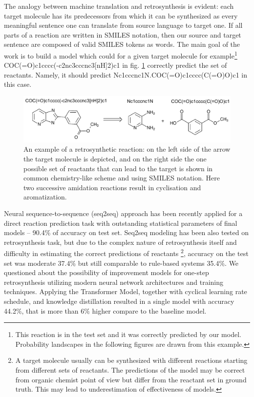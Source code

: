 \documentclass{article}
\begin{document}
The analogy between machine translation and retrosynthesis is evident: each target molecule has 
its predecessors from which it can be synthesized as every meaningful sentence one can translate 
from source language to target one. If all parts of a reaction are written in SMILES notation, 
then our source and target sentence are composed of valid SMILES tokens as words. 
The main goal of the work is to build a model which could for a given target molecule for example\footnote{
This reaction is in the test set and it was correctly predicted  by our model. 
Probability landscapes in the following figures are drawn from this example.} COC(=O)c1cccc(-c2nc3cccnc3[nH]2)c1 in fig. \ref{fig:example}
correctly predict the set of reactants. Namely, it should predict Nc1cccnc1N.COC(=O)c1cccc(C(=O)O)c1 in this case.

\begin{figure}
  \centering
  \includegraphics[scale=0.87]{images/example-reaction.pdf}
  \caption{An example of a retrosynthetic reaction: on the left side of the arrow the target molecule is depicted, and on the right side the one possible set of reactants that can lead to the target is shown in common chemistry-like scheme and using SMILES notation. Here two successive amidation reactions result in cyclisation and aromatization.}
  \label{fig:example}
\end{figure}

Neural sequence-to-sequence (seq2seq) approach has been recently applied for a direct reaction 
prediction task \cite{SchwallerTranslation,SchwallerTransformer} with outstanding statistical 
parameters of final models -- 90.4\% of accuracy on test set. Seq2seq modeling has been also tested on 
retrosynthesis task\cite{Pande}, but due to the complex nature of retrosynthesis itself 
and difficulty in estimating the correct predictions of reactants
\footnote{A target molecule usually can be synthesized with different reactions starting from different sets of reactants. 
The predictions of the model may be correct from organic chemist point of view but differ from 
the reactant set in ground truth. This may lead to underestimation of effectiveness of models.}, 
accuracy on the test set was moderate 37.4\% but still comparable to rule-based systems 35.4\%. 
We questioned about the possibility of improvement models for one-step retrosynthesis utilizing modern neural network architectures 
and training techniques. Applying the Transformer Model\cite{Transformer}, 
together with cyclical learning rate schedule\cite{TransformerTips}, 
and knowledge distillation\cite{Hinton} resulted in a single model with accuracy 44.2\%, 
that is more than 6\% higher compare to the baseline model\cite{Pande}.  
\end{document}
